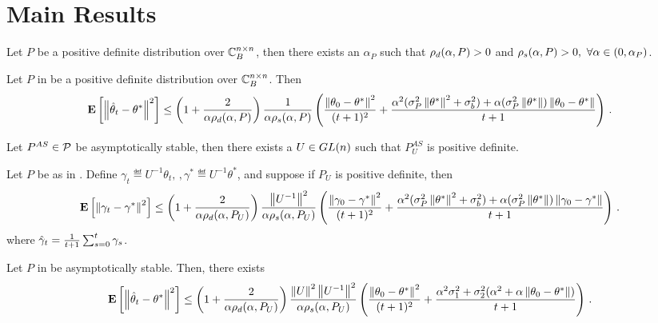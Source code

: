 \documentclass{article}
\begin{document}
\section{Main Results}
\begin{lemma}
Let $P$ be a positive definite distribution over $\C_B^{\ncn}$, then there exists an $\alpha_P$ such that $\rhod{P}>0$ and $\rhos{P}>0,~\forall \alpha \in (0,\alpha_P)$.
\end{lemma}
\begin{theorem}
Let $P$ in  be a positive definite distribution over $\C_B^{\ncn}$. Then
\begin{align}
\EE{\norm{\thh_t-\theta^*}^2}
\leq
\left(1+\frac2{\alpha\rhod{P}}\right)\frac{1}{\alpha \rhos{P}}
\left(\frac{\norm{\theta_0-\theta^*}^2}{(t+1)^2}+ \frac{\alpha^2(\sigma_P^2\norm{\ts}^2+\sigma_b^2)+\alpha (\sigma_P^2\norm{\ts})\norm{\theta_0-\theta^*}}{t+1} \right)\,.
\end{align}

\end{theorem}

\begin{lemma}
Let $P^{AS}\in\P$ be asymptotically stable, then there exists a $U\in \gln$ such that $P^{AS}_U$ is positive definite.
\end{lemma}

\begin{theorem}
Let $P$ be as in . Define $\gamma_t\eqdef U^{-1}\theta_t,\,,\gamma^*\eqdef U^{-1}\theta^*$, and suppose if $P_U$ is positive definite, then
\begin{align}
\EE{\norm{\gamma_t-\gamma^*}^2}
\leq
\left(1+\frac2{\alpha\rhod{P_U}}\right)\frac{\norm{U^{-1}}^2}{\alpha \rhos{P_U}}
\left(\frac{\norm{\gamma_0-\gamma^*}^2}{(t+1)^2}+ \frac{\alpha^2(\sigma_P^2\norm{\ts}^2+\sigma_b^2)+\alpha (\sigma_P^2\norm{\ts})\norm{\gamma_0-\gamma^*}}{t+1} \right)\,.
\end{align}
where $\gh_t=\frac{1}{t+1}\sum_{s=0}^t \gamma_s$.
\end{theorem}
\begin{corollary}
Let $P$ in  be asymptotically stable. Then, there exists
\begin{align}
\EE{\norm{\thh_t-\theta^*}^2}
\leq
\left(1+\frac2{\alpha\rhod{P_U}}\right)\frac{\norm{U}^2\norm{U^{-1}}^2}{\alpha \rhos{P_U}} \left(\frac{\norm{\theta_0-\theta^*}^2}{(t+1)^2}+ \frac{\alpha^2{\sigma}_1^2+ {\sigma}_2^2 (\alpha^2+\alpha \norm{\theta_0-\theta^*})}{t+1} \right)\,.
\end{align}
\end{corollary}
\end{document}
